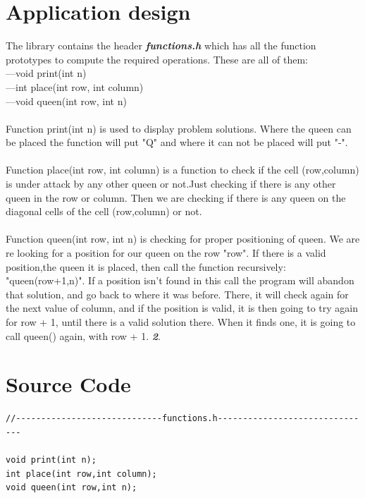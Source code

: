 \documentclass[14pt]{article}
\begin{document}
\section*{Application design}
\vspace{10 mm}
The library contains the header \textbf{\textit{functions.h}} which has all the function prototypes to compute the required operations. These are all of them:
\\---void print(int n)
\\---int place(int row, int column)
\\---void queen(int row, int n)
\\\vspace{3 mm}
\\Function print(int n) is used to display problem solutions. Where the queen can be placed the function will put "Q" and where it can not be placed will put "-". 
\\\vspace{3 mm}
\\ Function place(int row, int column) is a function to check if the cell (row,column) is under attack by any other queen or not.Just checking if there is any other queen in the row or column. Then we are checking if there is any queen on the diagonal cells of the cell (row,column) or not.
\\\vspace{2 mm}
\\Function queen(int row, int n) is checking for proper positioning of queen.
 We are re looking for a position for our queen on the row "row". If there is a valid position,the queen it is placed, then call the function recursively: "queen(row+1,n)".
If a position isn’t found in this call the program will abandon that solution, and go back to where it was before. There, it will check again for the next value of column, and if the position is valid, it is then going to try again for row + 1, until there is a valid solution there. When it finds one, it is going to call queen() again, with row + 1.
 \textbf{\textit{2}}.


\newpage
\section*{Source Code}
\begin{lstlisting}
//-----------------------------functions.h-------------------------------

void print(int n);
int place(int row,int column);
void queen(int row,int n);
\end{lstlisting}
\end{document}
